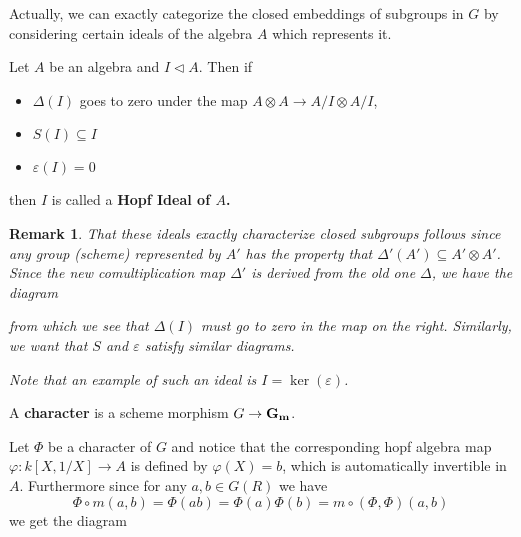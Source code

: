 \documentclass[12pt]{article}
\theoremstyle{nonumberbreak}
\theoremstyle{changebreak}
\theoremstyle{nonumberplain}
\theoremstyle{change}
\newtheorem{rmk}[thm]{Remark}
\newcommand*{\Gm}{\ensuremath\mathbf{G_m}}
\begin{document}
Actually, we can exactly categorize the closed embeddings of subgroups in $G$ by considering certain
ideals of the algebra $A$ which represents it. 
\begin{defn}
	Let $A$ be an algebra and $I\lhd A$. Then if 
	\begin{itemize}
		\item $\Delta(I)$ goes to zero under the map $A\otimes A\to A/I\otimes A/I$,
		\item $S(I)\subseteq I$
		\item $\varepsilon(I)=0$
	\end{itemize}
	then $I$ is called a \textbf{Hopf Ideal of $A$.}
\end{defn}

\begin{rmk}
	That these ideals exactly characterize closed subgroups follows since any group (scheme) represented
	by $A'$ has the property that $\Delta'(A')\subseteq A'\otimes A'$. Since the new comultiplication map
	$\Delta'$ is derived from the old one $\Delta$, we have the diagram
	\begin{figure}[h]
	\end{figure}
	
	\noindent from which we see that $\Delta(I)$ must go to zero in the map on the right.
	Similarly, we want that $S$ and $\varepsilon$ satisfy similar diagrams.

	Note that an example of such an ideal is $I=\ker(\varepsilon)$.
\end{rmk}

\begin{defn}
	A \textbf{character} is a scheme morphism $G\to \Gm$.
\end{defn}

Let $\Phi$ be a character of $G$ and notice that the corresponding hopf algebra map 
$\varphi:k[X,1/X]\to A$ is defined by $\varphi(X)=b$, which
is automatically invertible in $A$. Furthermore since for any $a,b\in G(R)$ we have
\[\Phi\circ m(a,b)=\Phi(ab)=\Phi(a)\Phi(b)=m\circ(\Phi,\Phi)(a,b)\]
we get the diagram
\begin{figure}[h]
\end{figure}
\end{document}
